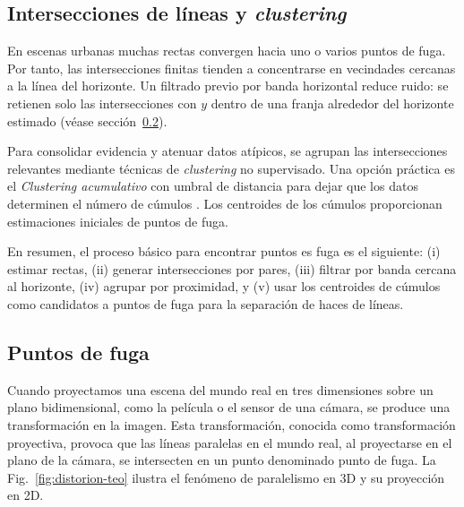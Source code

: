 \subsection{Intersecciones de líneas y \emph{clustering}}\label{sec:intersections-clustering}

En escenas urbanas muchas rectas convergen hacia uno o varios puntos de fuga. Por tanto, las
intersecciones finitas tienden a concentrarse en vecindades cercanas a la línea del horizonte. Un filtrado previo por banda horizontal reduce ruido: se retienen solo las intersecciones con \(y\) dentro de una franja alrededor del horizonte estimado (véase sección~\ref{sec:vanishing-points}).


Para consolidar evidencia y atenuar datos atípicos, se agrupan las intersecciones relevantes mediante técnicas de \emph{clustering} no supervisado. Una opción práctica es el \emph{Clustering acumulativo} con umbral de distancia para dejar que los datos determinen el número de cúmulos \cite{tan2005introduction}. Los centroides de los cúmulos proporcionan estimaciones iniciales de puntos de fuga\cite{kanatani1998statistical,hartley2003multiple}.


En resumen, el proceso básico para encontrar puntos es fuga es el siguiente: (i) estimar rectas, (ii) generar intersecciones por pares, (iii) filtrar por banda cercana al horizonte, (iv) agrupar por proximidad, y (v) usar los centroides de cúmulos como candidatos a puntos de fuga para la separación de haces de líneas.

\subsection{Puntos de fuga}\label{sec:vanishing-points}

Cuando proyectamos una escena del mundo real en tres dimensiones sobre un plano bidimensional,
como la película o el sensor de una cámara, se produce una transformación en la imagen.
Esta transformación, conocida como transformación proyectiva, provoca que las líneas paralelas en el mundo real,
al proyectarse en el plano de la cámara, se intersecten en un punto denominado punto de fuga.
La Fig.~\ref{fig:distorion-teo} ilustra el fenómeno de paralelismo en 3D y su proyección en 2D.

